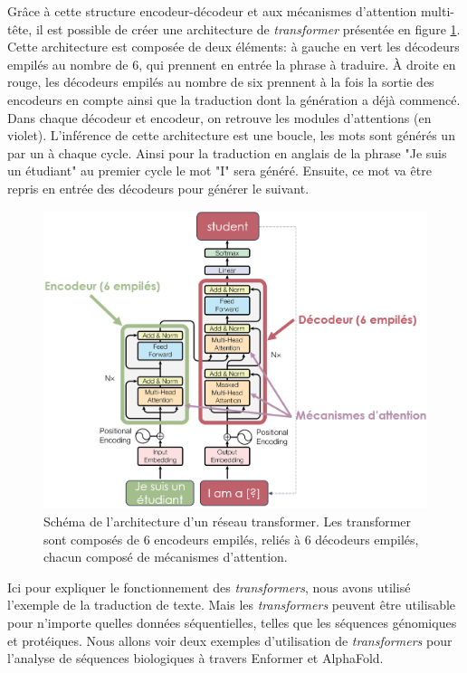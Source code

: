 Grâce à cette structure encodeur-décodeur et aux mécanismes d'attention multi-tête, il est possible de créer une architecture de \textit{transformer} présentée en figure \ref{fig:transformer}. Cette architecture est composée de deux éléments: à gauche en vert les décodeurs empilés au nombre de 6, qui prennent en entrée la phrase à traduire. À droite en rouge, les décodeurs empilés au nombre de six prennent à la fois la sortie des encodeurs en compte ainsi que la traduction dont la génération a déjà commencé. Dans chaque décodeur et encodeur, on retrouve les modules d'attentions (en violet). L'inférence de cette architecture est une boucle, les mots sont générés un par un à chaque cycle. Ainsi pour la traduction en anglais de la phrase "Je suis un étudiant" au premier cycle le mot "I" sera généré. Ensuite, ce mot va être repris en entrée des décodeurs pour générer le suivant.
\begin{figure}[!ht]
 \centering
 \includegraphics[width=1\textwidth]{figures/transformer.png}
 \caption[Schéma de l'architecture d'un réseau Transformer]{Schéma de l'architecture d'un réseau transformer. Les transformer sont composés de 6 encodeurs empilés, reliés à 6 décodeurs empilés, chacun composé de mécanismes d'attention.}
 \label{fig:transformer}
\end{figure}
Ici pour expliquer le fonctionnement des \textit{transformers}, nous avons utilisé l'exemple de la traduction de texte. Mais les \textit{transformers} peuvent être utilisable pour n'importe quelles données séquentielles, telles que les séquences génomiques et protéiques. Nous allons voir deux exemples d'utilisation de \textit{transformers} pour l'analyse de séquences biologiques à travers Enformer et AlphaFold.


